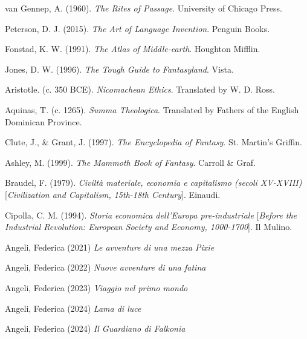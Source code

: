 van Gennep, A. (1960).
\textit{The Rites of Passage}.
University of Chicago Press.

Peterson, D. J. (2015).
\textit{The Art of Language Invention}.
Penguin Books.

Fonstad, K. W. (1991).
\textit{The Atlas of Middle-earth}.
Houghton Mifflin.

Jones, D. W. (1996).
\textit{The Tough Guide to Fantasyland}.
Vista.

Aristotle. (c. 350 BCE).
\textit{Nicomachean Ethics}.
Translated by W. D. Ross.

Aquinas, T. (c. 1265).
\textit{Summa Theologica}.
Translated by Fathers of the English Dominican Province.

Clute, J., \& Grant, J. (1997).
\textit{The Encyclopedia of Fantasy}.
St. Martin's Griffin.

Ashley, M. (1999).
\textit{The Mammoth Book of Fantasy}.
Carroll \& Graf.

Braudel, F. (1979).
\textit{Civiltà materiale, economia e capitalismo (secoli XV-XVIII)}
[\textit{Civilization and Capitalism, 15th-18th Century}].
Einaudi.

Cipolla, C. M. (1994).
\textit{Storia economica dell'Europa pre-industriale}
[\textit{Before the Industrial Revolution: European Society and Economy, 1000-1700}].
Il Mulino.



Angeli, Federica (2021)
\textit{Le avventure di una mezza Pixie}

Angeli, Federica (2022)
\textit{Nuove avventure di una fatina}

Angeli, Federica (2023)
\textit{Viaggio nel primo mondo}

Angeli, Federica (2024)
\textit{Lama di luce}

Angeli, Federica (2024)
\textit{Il Guardiano di Falkonia}
